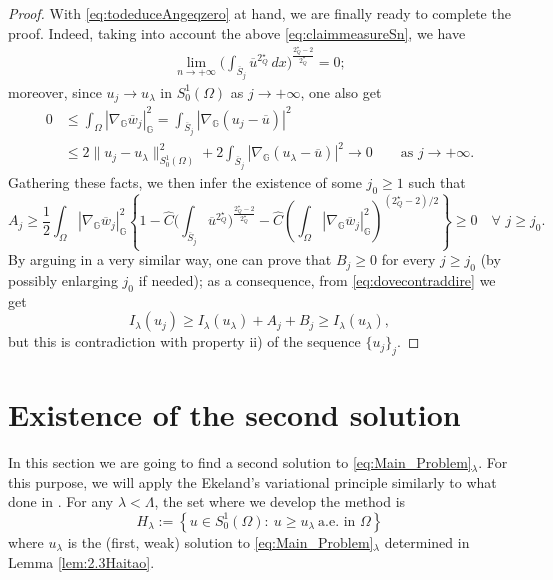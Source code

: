 \documentclass[11pt]{amsart}
\numberwithin{equation}{section} %
\theoremstyle{definition}
\newcommand{\m}{\mbox}
\begin{document}
\begin{proof}
	With \eqref{eq:todeduceAngeqzero} at hand, we are finally ready to complete the proof.
	Indeed, taking into account the above \eqref{eq:claimmeasureSn}, we have
	\begin{align*}
		\lim_{n\to+\infty}\Big(\int_{\overline{S}_j}\overline{u}^{2^{\star}_{Q}}\,dx
		\Big)^{\frac{2^{\star}_{Q}-2}{2^{\star}_{Q}}} = 0; 
	\end{align*}
	moreover, since $u_j\to u_\lambda$ in $S^{1}_{0}(\Omega)$ as $j\to+\infty$, one also get
	\begin{align*}
		0& \leq \int_{\Omega}|\nabla_{\mathbb{G}}\overline{w}_j|_{\mathbb{G}}^2
		=\int_{\overline{S}_j}|\nabla_{\mathbb{G}} (u_j-
		\overline{u})|^2 \\
		& \leq 2 \|u_j-u_\lambda\|_{S^1_0(\Omega)}^2+2 \int_{\overline{S}_j}
		|\nabla_{\mathbb{G}} (u_\lambda-\overline{u})|^2  \to 0\qquad\text{as $j\to+\infty$}.
	\end{align*}
	Ga\-the\-ring these facts, we then infer the existence of some $j_0\geq 1$ such that
	$$A_j\geq \frac{1}{2}\int_{\Omega}|\nabla_{\mathbb{G}}\overline{w}_j|_{\mathbb{G}}^2 \left\{1-\hat{C}\Big(\int_{\overline{S}_j}\overline{u}^{2^{\star}_{Q}} 
	\Big)^{\frac{2^{\star}_{Q}-2}{2^{\star}_{Q}}}-\hat{C}\left(\int_{\Omega}|\nabla_{\mathbb{G}}\overline{w}_j|^2_{\mathbb{G}}\right)^{(2^{\star}_{Q}-2)/2}\right\} \geq 0\quad
	\forall\,\,j\geq j_0.$$
	By arguing in a very similar way, one can prove that $B_j\geq 0$ for every $j\geq j_0$
	(by possibly enlarging $j_0$ if needed); as a consequence, from 
	\eqref{eq:dovecontraddire} we get
	$$I_{\lambda}(u_j)\geq I_{\lambda}(u_\lambda) +A_j+B_j\geq I_{\lambda}(u_\lambda),$$
	but this is contradiction with property ii) of the sequence $\{u_j\}_j$.
\end{proof}

\medskip


\section{Existence of the second solution}\label{sec:Second_Solution}

In this section we are going to find 
a second solution to \eqref{eq:Main_Problem}$_\lambda$.
For this purpose, we will apply the Ekeland's variational principle
similarly to what done in \cite{Haitao}.
For any $\lambda<\Lambda$, the set where we develop the method is
\begin{equation}\label{def:tlambda}
H_\lambda:=\left\{u\in S^1_0(\Omega):\ u\geq u_\lambda\ \m{a.e.~in }\Omega\right\}
\end{equation}
where $u_\lambda$ is the (first, weak) solution to \eqref{eq:Main_Problem}$_\lambda$
determined in Lemma \ref{lem:2.3Haitao}. 
\end{document}
